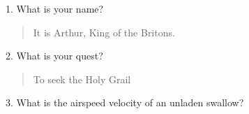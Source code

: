 \documentclass{questionresponse}
\begin{document}
1. What is your name?

\begin{quote}
It is Arthur, King of the Britons.
\end{quote}

\filbreak

2. What is your quest?

\begin{quote}
To seek the Holy Grail
\end{quote}

\filbreak

3. What is the airspeed velocity of an unladen swallow?


\end{document}
